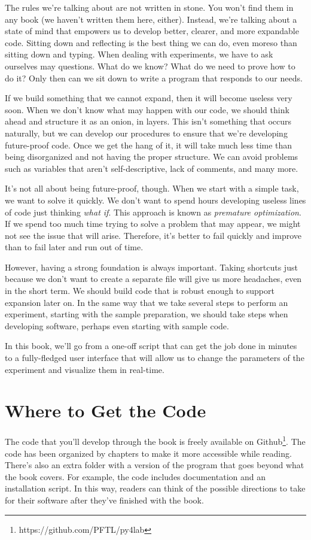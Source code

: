 The rules we're talking about are not written in stone. You won't find them in any book (we haven't written them here, either). Instead, we're talking about a state of mind that empowers us to develop better, clearer, and more expandable code. Sitting down and reflecting is the best thing we can do, even moreso than sitting down and typing. When dealing with experiments, we have to ask ourselves may questions. What do we know? What do we need to prove how to do it? Only then can we sit down to write a program that responds to our needs.

If we build something that we cannot expand, then it will become useless very soon. When we don't know what may happen with our code, we should think ahead and structure it as an onion, in layers. This isn't something that occurs naturally, but we can develop our procedures to ensure that we're developing future-proof code. Once we get the hang of it, it will take much less time than being disorganized and not having the proper structure. We can avoid problems such as variables that aren't self-descriptive, lack of comments, and many more.

It's not all about being future-proof, though. When we start with a simple task, we want to solve it quickly. We don't want to spend hours developing useless lines of code just thinking \textit{what if}. This approach is known as \textit{premature optimization}. If we spend too much time trying to solve a problem that may appear, we might not see the issue that will arise. Therefore, it's better to fail quickly and improve than to fail later and run out of time.

However, having a strong foundation is always important. Taking shortcuts just because we don't want to create a separate file will give us more headaches, even in the short term. We should build code that is robust enough to support expansion later on. In the same way that we take several steps to perform an experiment, starting with the sample preparation, we should take steps when developing software, perhaps even starting with sample code.

In this book, we'll go from a one-off script that can get the job done in minutes to a fully-fledged user interface that will allow us to change the parameters of the experiment and visualize them in real-time.

\section{Where to Get the Code}\label{sec:where-to-get-the-code}
The code that you'll develop through the book is freely available on Github\footnote{https://github.com/PFTL/py4lab}. The code has been organized by chapters to make it more accessible while reading. There's also an extra folder with a version of the program that goes beyond what the book covers. For example, the code includes documentation and an installation script. In this way, readers can think of the possible directions to take for their software after they've finished with the book.

